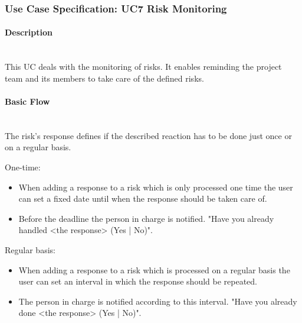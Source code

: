 
\newpage
\subsubsection{Use Case Specification: \ac{UC}7 Risk Monitoring}
\label{sec:domainBbh}

\paragraph*{Description}\mbox{}\\
This \ac{UC} deals with the monitoring of risks. It enables reminding the project team and its members to take care of the defined risks.

\paragraph*{Basic Flow} \mbox{}\\
\noindent
The risk's response defines if the described reaction has to be done just once or on a regular basis. 

\noindent
One-time:
\begin{itemize}
	\vspace{-3mm}
	\setlength\itemsep{-1em}	
	\item When adding a response to a risk which is only processed one time the user can set a fixed date until when the response should be taken care of.
	\item Before the deadline the person in charge is notified. "Have you already handled <the response> (Yes | No)".
\end{itemize}

\noindent
Regular basis:
\begin{itemize}
	\vspace{-3mm}
	\setlength\itemsep{-1em}
	
	\item When adding a response to a risk which is processed on a regular basis the user can set an interval in which the response should be repeated.
	\item The person in charge is notified according to this interval. "Have you already done <the response> (Yes | No)".
\end{itemize}

